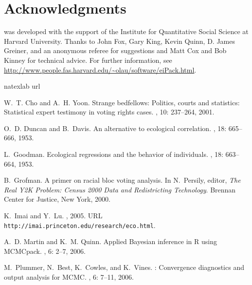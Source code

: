 \section*{Acknowledgments}

 was developed with the support of the Institute for
Quantitative Social Science at Harvard University.  Thanks to John
Fox, Gary King, Kevin Quinn, D. James Greiner, and an anonymous
referee for suggestions and Matt Cox and Bob Kinney for technical
advice.  For further information, see
\url{http://www.people.fas.harvard.edu/~olau/software/eiPack.html}.


\begin{thebibliography}{9}
\expandafter\ifx\csname natexlab\endcsname\relax\def\natexlab#1{#1}\fi
\expandafter\ifx\csname url\endcsname\relax
  \def\url#1{{\tt #1}}\fi

W.~T. Cho and A.~H. Yoon.
\newblock Strange bedfellows: Politics, courts and statistics: Statistical
  expert testimony in voting rights cases.
, 10:
  237--264, 2001.

O.~D. Duncan and B.~Davis.
\newblock An alternative to ecological correlation.
, 18: 665--666, 1953.

L.~Goodman.
\newblock Ecological regressions and the behavior of individuals.
, 18: 663--664, 1953.

B.~Grofman.
\newblock A primer on racial bloc voting analysis.
\newblock In N.~Persily, editor, {\em The Real {Y}2{K} Problem: Census 2000
  Data and Redistricting Technology}. Brennan Center for Justice, New York,
  2000.

K.~Imai and Y.~Lu.
, 2005.
\newblock URL \url{http://imai.princeton.edu/research/eco.html}.

A.~D. Martin and K.~M. Quinn.
\newblock Applied {B}ayesian inference in {R} using {MCMC}pack.
, 6: 2--7, 2006.

M.~Plummer, N.~Best, K.~Cowles, and K.~Vines.
: Convergence diagnostics and output analysis for {MCMC}.
, 6: 7--11, 2006.


\end{thebibliography}
